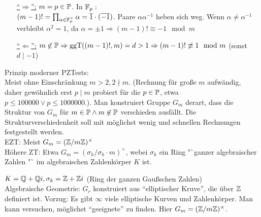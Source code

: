 \documentclass[a4paper,DIV15,BCOR12mm]{article}
\begin{document}
\begin{beweis}
 \begin{itemize}
  \item[\underline{"`$\Rightarrow$"':}] $m = p \in \mathbb{P}$. In $\mathbb{F}_p:$\\
   $(m-1)! = \prod_{\alpha \in \mathbb{F}_p^\times}\alpha = \overline 1 \cdot (\overline{-1})$. Paare $\alpha\alpha^{-1}$ heben sich weg. Wenn $\alpha \not= \alpha^{-1}$ verbleibt $\alpha^2 = 1$, da $\alpha = \pm 1 \Rightarrow (m-1)! \equiv -1 \mod m$
  \item[\underline{"`$\Leftarrow$"':}] $m \not\in \mathbb{P} \Rightarrow \mathop{\rm ggT}\nolimits ((m-1)!, m) = d > 1 \Rightarrow (m-1)! \not\equiv 1 \mod m$ (sonst $d \mid -1$)
 \end{itemize}
\end{beweis}

Prinzip moderner PZTests:\\
Meist ohne Einschränkung $m > 2, 2 \nmid m$. (Rechnung für große $m$ aufwändig, daher gewöhnlich erst $p \mid m$ probiert für die $p \in \mathbb{P}$, etwa $p \le 100000 \vee p \le 1000000$.). Man konstruiert Gruppe $G_m$ derart, dass die Struktur von $G_m$ für $m \in \mathbb{P} \wedge m \not\in \mathbb{P}$ verschieden ausfällt. Die Strukturverschiedenheit soll mit möglichst wenig und schnellen Rechnungen festgestellt werden.\\
EZT: Meist $G_m  = (\mathbb{Z} / m\mathbb{Z})^\times$\\
Höhere ZT: Etwa $G_m = (\sigma_k / \sigma_k \cdot m)^\times$, webei $\sigma_k$ ein Ring "`ganzer algebraischer Zahlen "` im algebraischen Zahlenkörper $K$ ist.
\begin{beispiel}
 $K = \mathbb{Q} + \mathbb{Q} i, \sigma_k = \mathbb{Z} + \mathbb{Z} i$ (Ring der ganzen Gaußschen Zahlen)\\
 Algebraische Geometrie: $G_r$ konstruiert aus "`elliptischer Kruve"', die über $\mathbb{Z}$ definiert ist. Vorzug: Es gibt $\infty$ viele elliptische Kurven und Zahlenkörper. Man kann versuchen, möglichst "`geeignete"' zu finden. Hier $G_m = (\mathbb{Z} / m \mathbb{Z})^\times$.
\end{beispiel}
\end{document}
